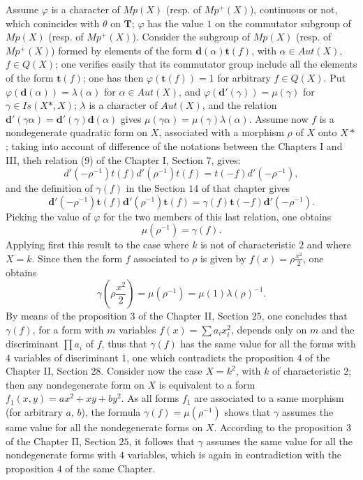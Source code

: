 \documentclass[12pt]{amsart}
\begin{document}
Assume $\varphi$ is a character of $Mp(X)$ (resp. of $Mp^{+}(X)$),
continuous or not, which conincides with $\theta$ on $\mathbf{T}$;
$\varphi$ has the value $1$ on the commutator subgroup of $Mp(X)$
(resp. of $Mp^{+}(X)$). Consider the subgroup of $Mp(X)$ (resp.
of $Mp^{+}(X)$) formed by elements of the form $\mathbf{d}(\alpha)\mathbf{t}(f)$,
with $\alpha\in Aut(X)$, $f\in Q(X)$; one verifies easily that its
commutator group include all the elements of the form $\mathbf{t}(f)$;
one has then $\varphi(\mathbf{t}(f))=1$ for arbitrary $f\in Q(X)$.
Put $\varphi(\mathbf{d}(\alpha))=\lambda(\alpha)$ for $\alpha\in Aut(X)$,
and $\varphi(\mathbf{d}'(\gamma))=\mu(\gamma)$ for $\gamma\in Is(X*,X)$;
$\lambda$ is a character of $Aut(X)$, and the relation $\mathbf{d}'(\gamma\alpha)=\mathbf{d}'(\gamma)\mathbf{d}(\alpha)$
gives $\mu(\gamma\alpha)=\mu(\gamma)\lambda(\alpha)$. Assume now
$f$ is a nondegenerate quadratic form on $X$, associated with a
morphism $\rho$ of $X$ onto $X*$; taking into account of difference
of the notations between the Chapters I and III, theh relation (9)
of the Chapter I, Section $7$, gives:\[
d'(-\rho^{-1})t(f)d'(\rho^{-1})t(f)=t(-f)d'(-\rho^{-1}),\]
and the definition of $\gamma(f)$ in the Section $14$ of that chapter
gives\[
\mathbf{d}'(-\rho^{-1})\mathbf{t}(f)\mathbf{d}'(\rho^{-1})\mathbf{t}(f)=\gamma(f)\mathbf{t}(-f)\mathbf{d}'(-\rho^{-1}).\]
Picking the value of $\varphi$ for the two members of this last relation,
one obtains\[
\mu(\rho^{-1})=\gamma(f).\]
Applying first this result to the case where $k$ is not of characteristic
$2$ and where $X=k$. Since then the form $f$ associated to $\rho$
is given by $f(x)=\rho\frac{x^{2}}{2}$, one obtains\[
\gamma(\rho\frac{x^{2}}{2})=\mu(\rho^{-1})=\mu(1)\lambda(\rho)^{-1}.\]
By means of the proposition $3$ of the Chapter II, Section $25$,
one concludes that $\gamma(f)$, for a form with $m$ variables $f(x)=\sum a_{i}x_{i}^{2}$,
depends only on $m$ and the discriminant $\prod a_{i}$ of $f$,
thus that $\gamma(f)$ has the same value for all the forms with $4$
variables of discriminant $1$, one which contradicts the proposition
$4$ of the Chapter II, Section $28$. Consider now the case $X=k^{2}$,
with $k$ of characteristic $2$; then any nondegenerate form on $X$
is equivalent to a form $f_{1}(x,y)=ax^{2}+xy+by^{2}$. As all forms
$f_{1}$ are associated to a same morphism (for arbitrary $a$, $b$),
the formula $\gamma(f)=\mu(\rho^{-1})$ shows that $\gamma$ assumes
the same value for all the nondegenerate forms on $X$. According
to the proposition $3$ of the Chapter II, Section $25$, it follows
that $\gamma$ assumes the same value for all the nondegenerate forms
with $4$ variables, which is again in contradiction with the proposition
$4$ of the same Chapter.
\end{document}
